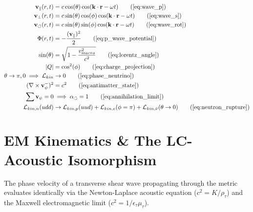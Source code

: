 \documentclass[11pt, a4paper]{article}
\begin{document}
\begin{tcolorbox}[recallbox, title={\ref{box:wave_mechanics}. Continuous Wave Mechanics \& Topological Phase States}]
\begin{align}
    \mathbf{v}_{\parallel}(r,t) &= c \cos(\theta) \cos(\mathbf{k} \cdot \mathbf{r} - \omega t) \tag{\ref{eq:wave_p}} \\
    \mathbf{v}_{\perp}(r,t) &= c \sin(\theta)\cos(\phi) \cos(\mathbf{k} \cdot \mathbf{r} - \omega t) \tag{\ref{eq:wave_s}} \\
    \mathbf{v}_{\circlearrowleft}(r,t) &= c \sin(\theta)\sin(\phi) \cos(\mathbf{k} \cdot \mathbf{r} - \omega t) \tag{\ref{eq:wave_rot}} \\
    \Phi(r,t) &= - \frac{(\mathbf{v}_{\parallel})^2}{2} \tag{\ref{eq:p_wave_potential}} \\
    \sin(\theta) &= \sqrt{1 - \frac{v_{macro}^2}{c^2}} \tag{\ref{eq:lorentz_angle}} \\
    |Q| &= \cos^2(\phi) \tag{\ref{eq:charge_projection}} \\
    \theta \to \pi, 0 \implies \mathcal{L}_{kin} &\to 0 \tag{\ref{eq:phase_neutrino}} \\
    (\nabla \times \mathbf{v}_{\psi}^-)^2 &= c^2 \tag{\ref{eq:antimatter_state}} \\
    \sum \mathbf{v}_{\psi} = 0 &\implies \alpha_{\circlearrowleft} = 1 \tag{\ref{eq:annihilation_limit}} \\
    \mathcal{L}_{kin, n}(udd) &\to \mathcal{L}_{kin, p}(uud) + \mathcal{L}_{kin, e}(\phi=\pi) + \mathcal{L}_{kin, \bar{\nu}}(\theta \to 0) \tag{\ref{eq:neutron_rupture}}
\end{align}
\end{tcolorbox}












\section{EM Kinematics \& The LC-Acoustic Isomorphism}
\label{sec:deriv_em_lc_isomorphism}

The phase velocity of a transverse shear wave propagating through the metric evaluates identically via the Newton-Laplace acoustic equation ($c^2 = K/\rho_{\tau}$) and the Maxwell electromagnetic limit ($c^2 = 1/\epsilon_{\tau}\mu_{\tau}$). 
\end{document}
